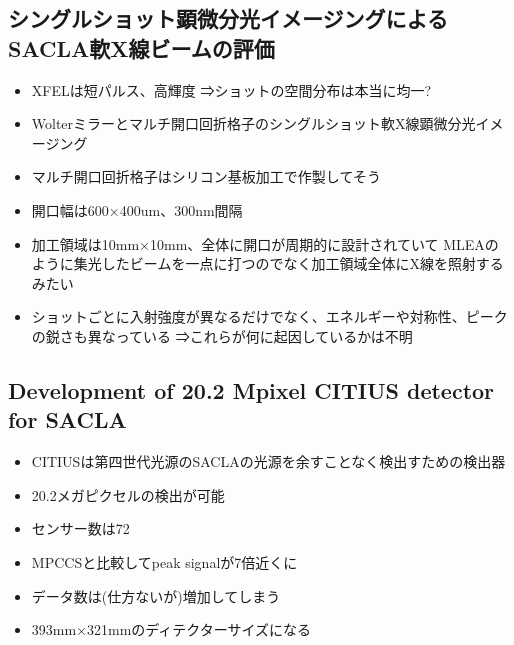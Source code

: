 \documentclass[a4paper,12pt]{ltjsreport}
\begin{document}
\subsection*{シングルショット顕微分光イメージングによるSACLA軟X線ビームの評価}
\begin{itemize}
  \item XFELは短パルス、高輝度
        ⇒ショットの空間分布は本当に均一?
  \item Wolterミラーとマルチ開口回折格子のシングルショット軟X線顕微分光イメージング
  \item マルチ開口回折格子はシリコン基板加工で作製してそう
  \item 開口幅は600×400um、300nm間隔
  \item 加工領域は10mm×10mm、全体に開口が周期的に設計されていて
        MLEAのように集光したビームを一点に打つのでなく加工領域全体にX線を照射するみたい
  \item ショットごとに入射強度が異なるだけでなく、エネルギーや対称性、ピークの鋭さも異なっている
        ⇒これらが何に起因しているかは不明
\end{itemize}
\subsection*{Development of 20.2 Mpixel CITIUS detector for SACLA}
\begin{itemize}
  \item CITIUSは第四世代光源のSACLAの光源を余すことなく検出すための検出器
  \item 20.2メガピクセルの検出が可能
  \item センサー数は72
  \item MPCCSと比較してpeak signalが7倍近くに
  \item データ数は(仕方ないが)増加してしまう
  \item 393mm×321mmのディテクターサイズになる
\end{itemize}
\end{document}
